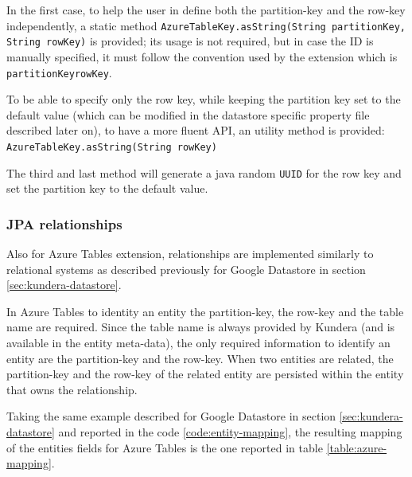 \noindent In the first case, to help the user in define both the partition-key and the row-key independently, a static method \texttt{AzureTableKey.asString(String partitionKey, String rowKey)} is provided; its usage is not required, but in case the ID is manually specified, it must follow the convention used by the extension which is \texttt{partitionKey\textunderscore rowKey}.

\noindent To be able to specify only the row key, while keeping the partition key set to the default value (which can be modified in the datastore specific property file described later on), to have a more fluent API, an utility method is provided: \texttt{AzureTableKey.asString(String rowKey)} 

\noindent The third and last method will generate a java random \texttt{UUID} for the row key and set the partition key to the default value.

\subsubsection{JPA relationships}
Also for Azure Tables extension, relationships are implemented similarly to relational systems as described previously for Google Datastore in section \ref{sec:kundera-datastore}.

\noindent In Azure Tables to identity an entity the partition-key, the row-key and the table name are required. Since the table name is always provided by Kundera (and is available in the entity meta-data), the only required information to identify an entity are the partition-key and the row-key.
When two entities are related, the partition-key and the row-key of the related entity are persisted within the entity that owns the relationship.


\newparagraph Taking the same example described for Google Datastore in section \ref{sec:kundera-datastore} and reported in the code \ref{code:entity-mapping}, the resulting mapping of the entities fields for Azure Tables is the one reported in table \ref{table:azure-mapping}.

\begin{table}[ht]
\small
\centering
{}
\\
\caption{Mapping of entity fields on Azure Tables}
\label{table:azure-mapping}
\end{table}

